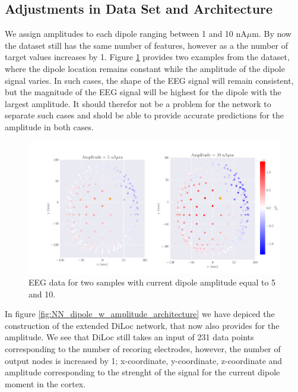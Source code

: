 \documentclass[a4paper, UKenglish, 11pt]{uiomaster}
\begin{document}
\subsection{Adjustments in Data Set and Architecture}

We assign amplitudes to each dipole ranging between 1 and 10 nA$\mu$m. By now the dataset still has the same number of features, however as a the number of target values increases by 1. Figure \ref{fig:dipole_w_amplitude_example} provides two examples from the dataset, where the dipole location remains constant while the amplitude of the dipole signal varies. In such cases, the shape of the EEG signal will remain consistent, but the magnitude of the EEG signal will be highest for the dipole with the largest amplitude. It should therefor not be a problem for the network to separate such cases and shold be able to provide accurate predictions for the amplitude in both cases.

\begin{figure}[!htb]
    \centering
    \includegraphics[width=\linewidth]{figures/dipole_w_amplitude_example.pdf}
    \caption{EEG data for two samples with current dipole amplitude equal to 5 and 10.}
    \label{fig:dipole_w_amplitude_example}
\end{figure}

In figure \ref{fig:NN_dipole_w_amplitude_architecture} we have depiced the construction of the extended DiLoc network, that now also provides for the amplitude. We see that DiLoc still takes an input of 231 data points corresponding to the number of recoring electrodes, however, the number of output nodes is increased by 1; x-coordinate, y-coordinate, z-coordinate and amplitude corresponding to the strenght of the signal for the current dipole moment in the cortex.
\end{document}

